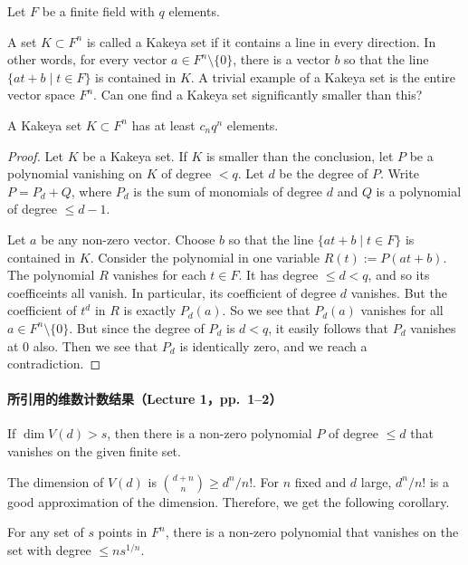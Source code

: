 Let $F$ be a finite field with $q$ elements.

A set $K\subset F^n$ is called a Kakeya set if it contains a line in every direction. In other words, for every vector $a\in F^n\setminus\{0\}$, there is a vector $b$ so that the line $\{at+b\mid t\in F\}$ is contained in $K$. A trivial example of a Kakeya set is the entire vector space $F^n$. Can one find a Kakeya set significantly smaller than this?

\begin{theorem}[0.2]
A Kakeya set $K\subset F^n$ has at least $c_nq^n$ elements.
\end{theorem}
\begin{proof}
Let $K$ be a Kakeya set. If $K$ is smaller than the conclusion, let $P$ be a polynomial vanishing on $K$ of degree $<q$. Let $d$ be the degree of $P$. Write $P=P_d+Q$, where $P_d$ is the sum of monomials of degree $d$ and $Q$ is a polynomial of degree $\leq d-1$.

Let $a$ be any non-zero vector. Choose $b$ so that the line $\{at+b\mid t\in F\}$ is contained in $K$. Consider the polynomial in one variable $R(t):=P(at+b)$. The polynomial $R$ vanishes for each $t\in F$. It has degree $\leq d<q$, and so its coefficeints all vanish. In particular, its coefficient of degree $d$ vanishes. But the coefficient of $t^d$ in $R$ is exactly $P_d(a)$. So we see that $P_d(a)$ vanishes for all $a\in F^n\setminus\{0\}$. But since the degree of $P_d$ is $d<q$, it easily follows that $P_d$ vanishes at $0$ also. Then we see that $P_d$ is identically zero, and we reach a contradiction.
\end{proof}

\paragraph{所引用的维数计数结果（Lecture 1，pp.~1--2）}
\begin{corollary}[0.2]
If $\dim V(d)>s$, then there is a non-zero polynomial $P$ of degree $\leq d$ that vanishes on the given finite set.
\end{corollary}
The dimension of $V(d)$ is $\binom{d+n}{n}\geq d^n/n!$. For $n$ fixed and $d$ large, $d^n/n!$ is a good approximation of the dimension. Therefore, we get the following corollary.
\begin{corollary}[0.3]
For any set of $s$ points in $F^n$, there is a non-zero polynomial that vanishes on the set with degree $\leq ns^{1/n}$.
\end{corollary}
